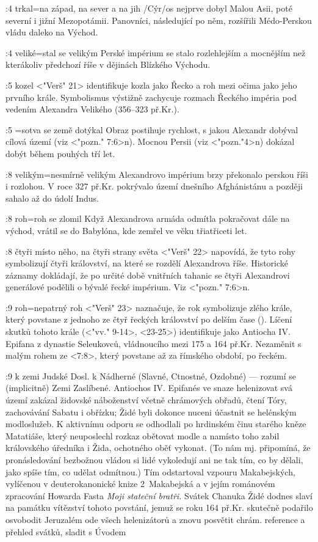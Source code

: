 :4 {trkal}={na západ, na sever a na jih} \x/Cýr/os nejprve dobyl Malou Asii, poté severní i jižní Mezopotámii. Panovníci, následující po něm, rozšířili Médo-Perskou vládu daleko na Východ. 

:4 {veliké}={stal se velikým} Perské impérium se stalo rozlehlejším a mocnějším než kterákoliv předchozí říše v dějinách Blízkého Východu.

:5 {kozel}  <"Verš" 21> identifikuje kozla jako Řecko a roh mezi očima jako jeho prvního krále. Symbolismus výstižně zachycuje rozmach Řeckého impéria pod vedením Alexandra Velikého (356--323 př.Kr.). 

:5 {}={sotva se země dotýkal} Obraz postihuje rychlost, s jakou Alexandr dobýval cílová území   (viz <"pozn." 7:6>n). Mocnou Persii (viz <"pozn."4>n) dokázal dobýt během pouhých tří let.

:8 {velikým}={nesmírně velikým} Alexandrovo impérium brzy překonalo perskou říši i rozlohou. V roce 327 př.Kr. pokrývalo území dnešního Afghánistánu a později sahalo až do údolí Indus.

:8 {roh}={roh se zlomil}  Když Alexandrova armáda odmítla pokračovat dále na východ, vrátil se do Babylóna, kde zemřel ve věku třiatřiceti let. 

:8 {čtyři místo něho, na čtyři strany světa}  <"Verš" 22> napovídá, že tyto rohy symbolizují čtyři království, na které se rozdělí Alexandrova říše. Historické záznamy dokládají, že po určité době vnitřních tahanic  se čtyři Alexandrovi generálové podělili o bývalé řecké impérium. Viz <"pozn." 7:6>n.

:9 {roh}={nepatrný roh}  <"Verš" 23> naznačuje, že rok symbolizuje zlého krále, který povstane z jednoho ze čtyř řeckých království po delším čase (). 
Líčení skutků tohoto krále (<"vv." 9-14>, <23-25>) identifikuje jako Antiocha IV. Epifana z dynastie
Seleukovců, vládnoucího mezi 175 a 164 př.Kr. Nezaměnit s malým rohem ze <7:8>, který povstane až za římského období, po řeckém. 

:9 {k zemi Judské} Dosl. k Nádherné (Slavné, Ctnostné, Ozdobné) --- rozumí se (implicitně) Zemi Zaslíbené. Antiochos IV. Epifanés ve snaze helenizovat svá území zakázal židovské náboženství včetně chrámových obřadů, čtení Tóry, zachovávání Sabatu i obřízku; Židé byli dokonce nuceni účastnit se helénským modloslužeb. K aktivnímu odporu se odhodlali po hrdinském činu starého kněze Matatiáše, který neuposlechl rozkaz obětovat modle a namísto toho zabil královského úředníka i Žida, ochotného oběť vykonat. (To nám mj. připomíná, že pronásledování bezbožnou vládou si lidé vykoledují ani ne tak tím, co by dělali, jako spíše tím, co udělat odmítnou.)
Tím odstartoval vzpouru Makabejských, vylíčenou v deuterokanonické knize 2~Makabejská a v jejím románovém zpracování Howarda Fasta {\em Moji stateční bratři.}
Svátek Chanuka Židé dodnes slaví na památku vítězství tohoto povstání, jemuž se roku 164 př.Kr. skutečně podařilo osvobodit Jeruzalém ode všech helenizátorů a znovu posvětit chrám.
\dopsat reference a přehled svátků, sladit s Úvodem

